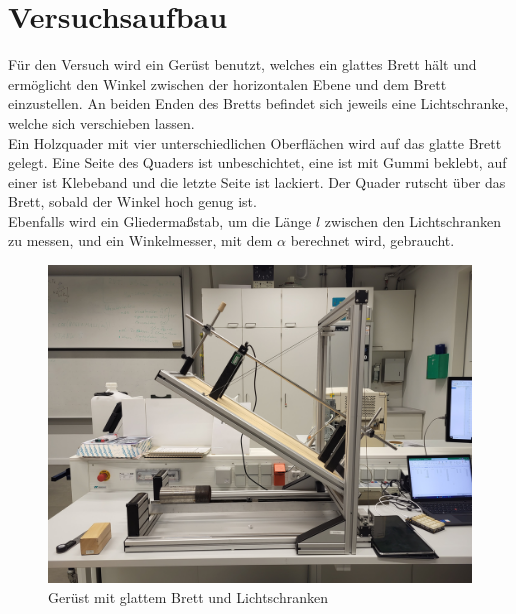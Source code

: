 \section{Versuchsaufbau}

Für den Versuch wird ein Gerüst benutzt, welches ein glattes Brett hält und ermöglicht den Winkel zwischen der horizontalen Ebene und dem Brett einzustellen. An beiden Enden des Bretts befindet sich jeweils eine Lichtschranke, welche sich verschieben lassen.\\
Ein Holzquader mit vier unterschiedlichen Oberflächen wird auf das glatte Brett gelegt. Eine Seite des Quaders ist unbeschichtet, eine ist mit Gummi beklebt, auf einer ist Klebeband und die letzte Seite ist lackiert. Der Quader rutscht über das Brett, sobald der Winkel hoch genug ist.\\
Ebenfalls wird ein Gliedermaßstab, um die Länge $l$ zwischen den Lichtschranken zu messen, und ein Winkelmesser, mit dem $\alpha$ berechnet wird, gebraucht.
\begin{figure}[ht]
    \centering
    \includegraphics[width=\linewidth/2]{images/Versuch-Aufbau.jpg}
    \caption[Aufbau]{Gerüst mit glattem Brett und Lichtschranken}
    \label{fig:Aufbau}
\end{figure}
